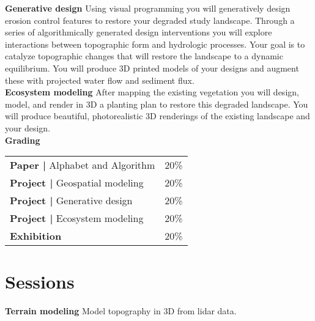 \documentclass[11pt,article,oneside]{memoir}
\begin{document}

\noindent \textbf{Generative design}
Using visual programming you will generatively design
erosion control features to restore your degraded study landscape.
Through a series of algorithmically generated design interventions 
you will explore interactions between 
topographic form and hydrologic processes.
Your goal is to catalyze topographic changes that will 
restore the landscape to a dynamic equilibrium.  
You will produce 3D printed models of your designs
and augment these with projected water flow and sediment flux. \\

\noindent \textbf{Ecosystem modeling}
After mapping the existing vegetation 
you will design, model, and render in 3D
a planting plan to restore this degraded landscape. 
You will produce beautiful, photorealistic 3D renderings  
of the existing landscape and your design. \\

\noindent \textbf{Grading}
%
\begin{table}[H]
\small
\begin{tabular}{l l}
%
\textbf{Paper |} Alphabet and Algorithm & 20\% \\
\textbf{Project |} Geospatial modeling & 20\% \\
\textbf{Project |} Generative design & 20\% \\
\textbf{Project |} Ecosystem modeling & 20\% \\
\textbf{Exhibition} & 20\% \\
%
\end{tabular}
\end{table}


\section{Sessions}

\renewcommand*{\bibfont}{\footnotesize}

\noindent \textbf{Terrain modeling}
Model topography in 3D from lidar data.\\
\end{document}
